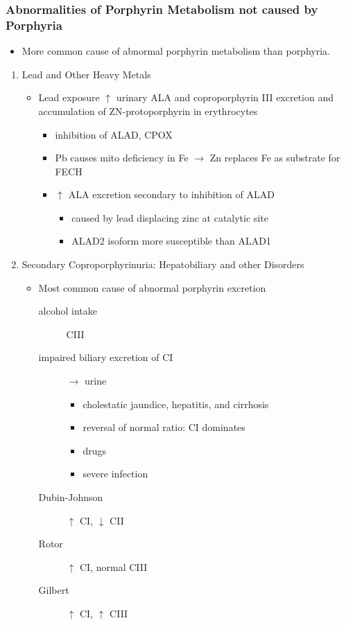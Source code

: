 \documentclass{scrartcl}
\begin{document}
\subsubsection{Abnormalities of Porphyrin Metabolism not caused by Porphyria}
\label{sec:org12c4c2f}
\begin{itemize}
\item More common cause of abnormal porphyrin metabolism than porphyria.
\end{itemize}
\begin{enumerate}
\item Lead and Other Heavy Metals
\label{sec:org8bcf278}
\begin{itemize}
\item Lead exposure \(\uparrow\) urinary ALA and coproporphyrin III excretion
and accumulation of ZN-protoporphyrin in erythrocytes
\begin{itemize}
\item inhibition of ALAD, CPOX
\item Pb causes mito deficiency in Fe \(\to\) Zn replaces Fe as
substrate for FECH
\item \(\uparrow\) ALA excretion secondary to inhibition of ALAD
\begin{itemize}
\item caused by lead displacing zinc at catalytic site
\item ALAD2 isoform more susceptible than ALAD1
\end{itemize}
\end{itemize}
\end{itemize}
\item Secondary Coproporphyrinuria: Hepatobiliary and other Disorders
\label{sec:org1196dfa}
\begin{itemize}
\item Most common cause of abnormal porphyrin excretion
\begin{description}
\item[{alcohol intake}] CIII
\item[{impaired biliary excretion of CI}] \(\to\) urine
\begin{itemize}
\item cholestatic jaundice, hepatitis, and cirrhosis
\item reversal of normal ratio: CI dominates
\item drugs
\item severe infection
\end{itemize}
\item[{Dubin-Johnson}] \(\uparrow\) CI, \(\downarrow\) CII
\item[{Rotor}] \(\uparrow\) CI, normal CIII
\item[{Gilbert}] \(\uparrow\) CI, \(\uparrow\) CIII
\end{description}
\end{itemize}


\end{enumerate}
\end{document}

